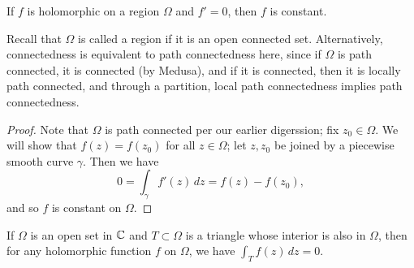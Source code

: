 \begin{corollary}
    If $f$ is holomorphic on a region $\Omega$ and $f' = 0$, then $f$ is constant.
\end{corollary}
\noindent Recall that $\Omega$ is called a region if it is an open connected set. Alternatively, connectedness is equivalent to path connectedness here, since if $\Omega$ is path connected, it is connected (by Medusa), and if it is connected, then it is locally path connected, and through a partition, local path connectedness implies path connectedness.
\begin{proof}
    Note that $\Omega$ is path connected per our earlier digerssion; fix $z_0 \in \Omega$. We will show that $f(z) = f(z_0)$ for all $z \in \Omega$; let $z, z_0$ be joined by a piecewise smooth curve $\gamma$. Then we have
    \[ 0 = \int_\gamma f'(z) \, dz = f(z) - f(z_0), \]
    and so $f$ is constant on $\Omega$.
\end{proof}
\newpage
\begin{theorem}
    If $\Omega$ is an open set in $\mathbb C$ and $T \subset \Omega$ is a triangle whose interior is also in $\Omega$, then for any holomorphic function $f$ on $\Omega$, we have $\int_T f(z) \, dz = 0$.
\end{theorem}
